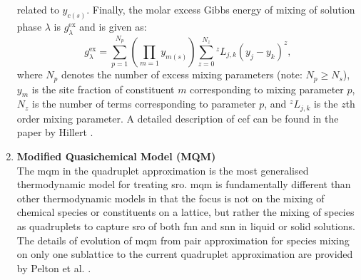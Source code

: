 \begin{enumerate}
related to $y_{c(s)}$.  Finally, the molar excess Gibbs energy of mixing of solution phase $\lambda$ is
$g_{\lambda}^\text{ex}$ and is given as:
\begin{equation}
	\label{eq:g_ex}
	g_{\lambda}^\text{ex} = 	 \sum_{p=1}^{N_p} \left( \prod_{m=1} y_{m(s)}  \right)   \sum_{z=0}^{N_z} {^zL_{j,k}} (y_j - y_k)^{z},
\end{equation}
where $N_p$ denotes the number of excess mixing parameters (note: $N_p \ge N_s$), $y_m$ is the site fraction of constituent $m$ corresponding to mixing parameter $p$, $N_z$ is the number of terms corresponding to parameter $p$,  and ${^zL_{j,k}}$ is the $z$th order mixing parameter. A detailed description of \gls{cef} can be found in the paper by Hillert \cite{Hillert01}.
	\item \textbf{Modified Quasichemical Model (MQM)} \\
	The \gls{mqm} in the quadruplet approximation is the most generalised thermodynamic model for treating \gls{sro}. \gls{mqm} is fundamentally different than other thermodynamic models in that the focus is not on the mixing of chemical species or constituents on a lattice, but rather the mixing of species as quadruplets to capture \gls{sro} of both \gls{fnn} and \gls{snn} in liquid or solid solutions. The details of evolution of \gls{mqm} from pair approximation for species mixing on only one sublattice to the current quadruplet approximation are provided by Pelton {et al.} \cite{Pelton00,Pelton01,Chartrand01,Pelton01b}.


\end{enumerate}
